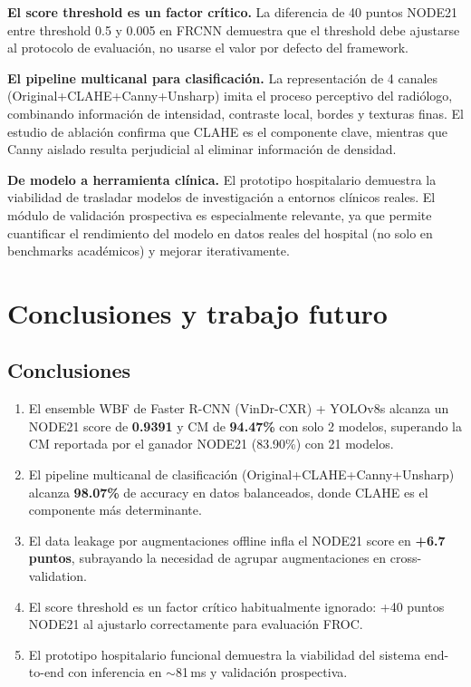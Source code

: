 \documentclass[conference]{IEEEtran}
\begin{document}
\textbf{El score threshold es un factor crítico.} La diferencia de 40 puntos NODE21 entre threshold 0.5 y 0.005 en FRCNN demuestra que el threshold debe ajustarse al protocolo de evaluación, no usarse el valor por defecto del framework.

\textbf{El pipeline multicanal para clasificación.} La representación de 4 canales (Original+CLAHE+Canny+Unsharp) imita el proceso perceptivo del radiólogo, combinando información de intensidad, contraste local, bordes y texturas finas. El estudio de ablación confirma que CLAHE es el componente clave, mientras que Canny aislado resulta perjudicial al eliminar información de densidad.

\textbf{De modelo a herramienta clínica.} El prototipo hospitalario demuestra la viabilidad de trasladar modelos de investigación a entornos clínicos reales. El módulo de validación prospectiva es especialmente relevante, ya que permite cuantificar el rendimiento del modelo en datos reales del hospital (no solo en benchmarks académicos) y mejorar iterativamente.

\section{Conclusiones y trabajo futuro}

\subsection{Conclusiones}

\begin{enumerate}
    \item El ensemble WBF de Faster R-CNN (VinDr-CXR) + YOLOv8s alcanza un NODE21 score de \textbf{0.9391} y CM de \textbf{94.47\%} con solo 2 modelos, superando la CM reportada por el ganador NODE21 (83.90\%) con 21 modelos.
    \item El pipeline multicanal de clasificación (Original+CLAHE+Canny+Unsharp) alcanza \textbf{98.07\%} de accuracy en datos balanceados, donde CLAHE es el componente más determinante.
    \item El data leakage por augmentaciones offline infla el NODE21 score en \textbf{+6.7 puntos}, subrayando la necesidad de agrupar augmentaciones en cross-validation.
    \item El score threshold es un factor crítico habitualmente ignorado: +40 puntos NODE21 al ajustarlo correctamente para evaluación FROC.
    \item El prototipo hospitalario funcional demuestra la viabilidad del sistema end-to-end con inferencia en $\sim$81\,ms y validación prospectiva.
\end{enumerate}
\end{document}
